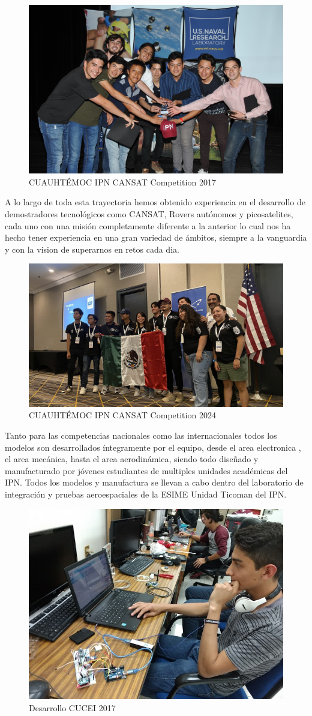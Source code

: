 \documentclass[letterpaper,12pt]{article} %
\begin{document}
    \begin{figure}[H]
      \centerline{\includegraphics[width=.6\textwidth]{CUAUH.jpg}}
      \caption{CUAUHTÉMOC IPN CANSAT Competition 2017}
      \label{fig:CC2017}
    \end{figure}

    A lo largo de toda esta trayectoria hemos obtenido experiencia en el desarrollo de demostradores tecnológicos como CANSAT, Rovers autónomos
    y picosatelites, cada uno con una misión completamente diferente a la anterior lo cual nos ha hecho tener experiencia en una gran variedad de ámbitos, 
    siempre a la vanguardia y con la vision de superarnos en retos cada dia.
    
    \begin{figure}[H]
      \centerline{\includegraphics[width=.6\textwidth]{cipn2.jpg}}
      \caption{CUAUHTÉMOC IPN CANSAT Competition 2024}
      \label{fig:CC2024}
    \end{figure}

    \newpage

    Tanto para las competencias nacionales como las internacionales todos los modelos son desarrollados íntegramente por el equipo, desde el area electronica 
    , el area mecánica, hasta el area aerodinámica, siendo todo diseñado y manufacturado por jóvenes estudiantes de multiples unidades académicas del IPN.
    Todos los modelos y manufactura se llevan a cabo dentro del laboratorio de integración y pruebas aeroespaciales de la ESIME Unidad Ticoman del IPN.

    \begin{figure}[H]
      \centerline{\includegraphics[width=.5\textwidth]{cipn3.jpg}}
      \caption{Desarrollo CUCEI 2017}
      \label{fig:DC}
    \end{figure}
\end{document}
